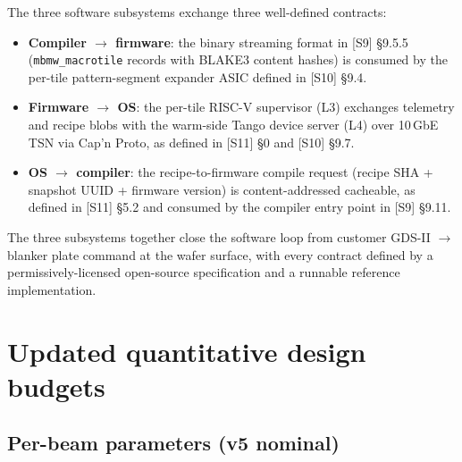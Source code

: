 \documentclass[11pt,letterpaper]{article}
\begin{document}
The three software subsystems exchange three well-defined contracts:

\begin{itemize}[leftmargin=1.6em]
  \item \textbf{Compiler $\to$ firmware}: the binary streaming format in [S9] \S 9.5.5 (\texttt{mbmw\_macrotile} records with BLAKE3 content hashes) is consumed by the per-tile pattern-segment expander ASIC defined in [S10] \S 9.4.
  \item \textbf{Firmware $\to$ OS}: the per-tile RISC-V supervisor (L3) exchanges telemetry and recipe blobs with the warm-side Tango device server (L4) over 10\,GbE TSN via Cap'n Proto, as defined in [S11] \S 0 and [S10] \S 9.7.
  \item \textbf{OS $\to$ compiler}: the recipe-to-firmware compile request (recipe SHA + snapshot UUID + firmware version) is content-addressed cacheable, as defined in [S11] \S 5.2 and consumed by the compiler entry point in [S9] \S 9.11.
\end{itemize}

The three subsystems together close the software loop from customer GDS-II $\to$ blanker plate command at the wafer surface, with every contract defined by a permissively-licensed open-source specification and a runnable reference implementation.

\clearpage
\section{Updated quantitative design budgets}

\subsection{Per-beam parameters (v5 nominal)}
\end{document}
